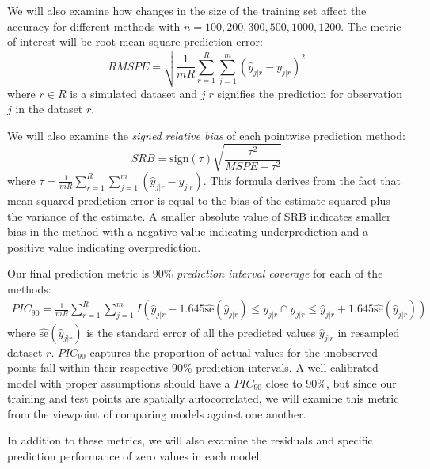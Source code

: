 \documentclass{article}
\begin{document}
We will also examine how changes in the size of the training set affect the accuracy for different methods with $n = 100, 200, 300, 500, 1000, 1200$.
The metric of interest will be root mean square prediction error:
$$
RMSPE = \sqrt{\frac{1}{mR} \sum_{r=1}^R \sum_{j=1}^m (\hat{y}_{j|r} - y_{j|r})^2}
$$
where $r \in R$ is a simulated dataset and $j|r$ signifies the prediction for observation $j$ in the dataset $r$.

We will also examine the \textit{signed relative bias} of each pointwise prediction method:
$$
SRB = \text{sign}(\tau) \sqrt{\frac{\tau^2}{MSPE - \tau^2}}
$$
where $\tau = \frac{1}{mR} \sum_{r = 1}^R \sum_{j = 1}^m (\hat{y}_{j|r} - y_{j|r})$.
This formula derives from the fact that mean squared prediction error is equal to the bias of the estimate squared plus the variance of the estimate.
A smaller absolute value of SRB indicates smaller bias in the method with a negative value indicating underprediction and a positive value indicating overprediction.\cite{verhoef13}

Our final prediction metric is 90\% \textit{prediction interval coverage} for each of the methods:
\begin{align*}
PIC_{90} = \frac{1}{mR} \sum_{r=1}^R \sum_{j=1}^m I\left(\hat{y}_{j|r} - 1.645\hat{\text{se}}(\hat{y}_{j|r}) \leq y_{j|r} \cap y_{j|r} \leq \hat{y}_{j|r} + 1.645\hat{\text{se}}(\hat{y}_{j|r})\right)
\end{align*}
where $\hat{\text{se}}(\hat{y}_{j|r})$ is the standard error of all the predicted values $\hat{y}_{j|r}$ in resampled dataset $r$.\cite{verhoef13}
$PIC_{90}$ captures the proportion of actual values for the unobserved points fall within their respective 90\% prediction intervals.
A well-calibrated model with proper assumptions should have a $PIC_{90}$ close to 90\%, but since our training and test points are spatially autocorrelated, we will examine this metric from the viewpoint of comparing models against one another. 

In addition to these metrics, we will also examine the residuals and specific prediction performance of zero values in each model.
\end{document}
